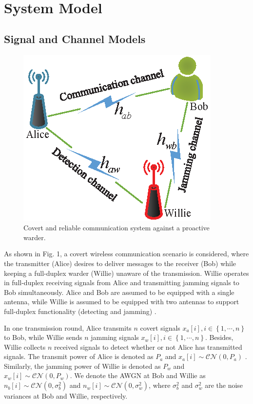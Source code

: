 \documentclass[conference]{IEEEtran}
\begin{document}
\section{System Model}
\subsection{Signal and Channel Models}
\begin{figure}
	\centering
	\includegraphics[width=0.65\linewidth]{figure/system.eps}
	\caption{Covert and reliable communication system against a proactive warder.}
	\label{fig_sim}
\end{figure}
As shown in Fig. 1, a covert wireless communication scenario is considered, where the transmitter (Alice) desires to deliver messages to the receiver (Bob) while keeping a full-duplex warder (Willie) unaware of the transmission. Willie operates in full-duplex receiving signals from Alice and transmitting jamming signals to Bob simultaneously. Alice and Bob are assumed to be equipped with a single antenna, while Willie is assumed to be equipped with two antennas to support full-duplex functionality (detecting and jamming) \cite{Active3}.

In one transmission round, Alice transmits $n$ covert signals $x_a\left[ i \right],i \in \left\{ {1, \cdots,n} \right\}$ to Bob, while Willie sends $n$ jamming signals $x_w[i],i \in \left\{ {1, \cdots,n} \right\}$. Besides, Willie collects $n$ received signals to detect whether or not Alice has transmitted signals. The transmit power of Alice is denoted as $P_a$ and $x_a\left[ i \right] \sim \mathcal{CN}\left( {0,P_a} \right)$ \cite{Gaussian}. Similarly, the jamming power of Willie is denoted as $P_w$ and $x_w\left[ i \right] \sim \mathcal{CN}\left( {0,P_w} \right)$. We denote the AWGN at Bob and Willie as ${n_b}\left[ i \right] \sim \mathcal{CN}\left( {0,\sigma _b^2} \right)$ and ${n_w}\left[ i \right] \sim \mathcal{CN}\left( {0,\sigma_w^2} \right)$, where $\sigma _b^2$ and $\sigma_w^2$ are the noise variances at Bob and Willie, respectively.
\end{document}
